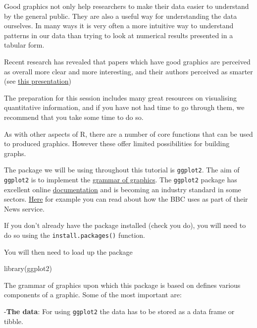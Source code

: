 \documentclass[
]{book}
\newenvironment{Shaded}{\begin{snugshade}}{\end{snugshade}}
\newcommand{\FunctionTok}[1]{\textcolor[rgb]{0.00,0.00,0.00}{#1}}
\newcommand{\NormalTok}[1]{#1}
\begin{document}
Good graphics not only help researchers to make their data easier to understand by the general public. They are also a useful way for understanding the data ourselves. In many ways it is very often a more intuitive way to understand patterns in our data than trying to look at numerical results presented in a tabular form.

Recent research has revealed that papers which have good graphics are perceived as overall more clear and more interesting, and their authors perceived as smarter (see \href{https://vimeo.com/181771433}{this presentation})

The preparation for this session includes many great resources on visualising quantitative information, and if you have not had time to go through them, we recommend that you take some time to do so.

As with other aspects of R, there are a number of core functions that can be used to produced graphics. However these offer limited possibilities for building graphs.

The package we will be using throughout this tutorial is \texttt{ggplot2}. The aim of \texttt{ggplot2} is to implement the \href{http://www.springer.com/statistics/computational+statistics/book/978-0-387-24544-7}{grammar of graphics}. The \texttt{ggplot2} package has excellent online \href{http://ggplot2.org/}{documentation} and is becoming an industry standard in some sectors. \href{https://medium.com/bbc-visual-and-data-journalism/how-the-bbc-visual-and-data-journalism-team-works-with-graphics-in-r-ed0b35693535}{Here} for example you can read about how the BBC uses as part of their News service.

If you don't already have the package installed (check you do), you will need to do so using the \texttt{install.packages()} function.

You will then need to load up the package

\begin{Shaded}
\begin{Highlighting}[]
\FunctionTok{library}\NormalTok{(ggplot2)                                  }
\end{Highlighting}
\end{Shaded}

The grammar of graphics upon which this package is based on defines various components of a graphic. Some of the most important are:

-\textbf{The data}: For using \texttt{ggplot2} the data has to be stored as a data frame or tibble.
\end{document}
